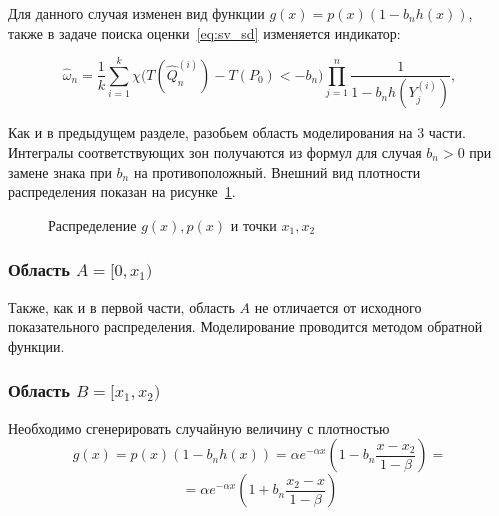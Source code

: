 \documentclass[12pt, specialist, subf, substylefile = spbu.rtx]{disser}
\begin{document}
Для данного случая изменен вид функции $g(x) = p(x)(1-b_n h(x))$, также 
в задаче поиска оценки~\eqref{eq:sv_sd} изменяется индикатор:

\begin{equation}\label{eq:est_minus}
\hat{\omega}_n=\frac{1}{k} \sum\limits_{i=1}^{k}
\chi \big(T(\hat{Q}^{(i)}_n)-T(P_0) < -b_n\big)
\prod\limits_{j=1}^{n} 
\frac{1}{1-b_nh(Y_j^{(i)})},
\end{equation}


Как и в предыдущем разделе, разобьем область моделирования на 3 части. Интегралы соответствующих зон получаются из формул для случая $b_n>0$ при замене знака при $b_n$ на противоположный. Внешний вид плотности распределения показан на рисунке~\ref{ris:plot2}. 

\begin{figure}[h]
\caption{Распределение $g(x), p(x)$ и точки $x_1, x_2$}
\label{ris:plot2}
\end{figure}


\subsubsection{Область $A=[0, x_1)$}

Также, как и в первой части, область $A$ не отличается от исходного показательного распределения. Моделирование проводится методом обратной функции.


\subsubsection{Область $B=[x_1, x_2)$}

Необходимо сгенерировать случайную величину с плотностью
$$
g(x) = p(x)(1-b_n h(x)) = \alpha e^{-\alpha x}(1-b_n \frac{x-x_2}{1-\beta})=
$$
\begin{equation}\label{eq:b2_g}
=\alpha e^{-\alpha x}(1+b_n \frac{x_2-x}{1-\beta})
\end{equation}
\end{document}
